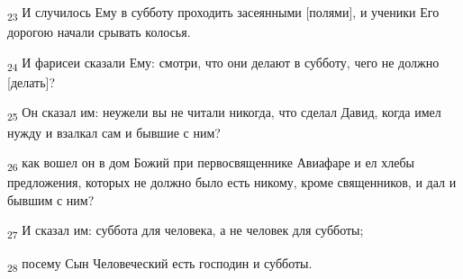 \begin{tcolorbox}
\textsubscript{23} И случилось Ему в субботу проходить засеянными [полями], и ученики Его дорогою начали срывать колосья.
\end{tcolorbox}
\begin{tcolorbox}
\textsubscript{24} И фарисеи сказали Ему: смотри, что они делают в субботу, чего не должно [делать]?
\end{tcolorbox}
\begin{tcolorbox}
\textsubscript{25} Он сказал им: неужели вы не читали никогда, что сделал Давид, когда имел нужду и взалкал сам и бывшие с ним?
\end{tcolorbox}
\begin{tcolorbox}
\textsubscript{26} как вошел он в дом Божий при первосвященнике Авиафаре и ел хлебы предложения, которых не должно было есть никому, кроме священников, и дал и бывшим с ним?
\end{tcolorbox}
\begin{tcolorbox}
\textsubscript{27} И сказал им: суббота для человека, а не человек для субботы;
\end{tcolorbox}
\begin{tcolorbox}
\textsubscript{28} посему Сын Человеческий есть господин и субботы.
\end{tcolorbox}

